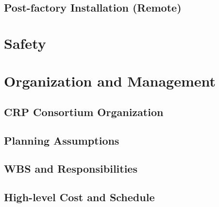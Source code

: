 \subsection{Post-factory Installation (Remote)}
\label{sec:fddp-crp-qc-remote}



\section{Safety}
\label{sec:fddp-crp-safety}






\section{Organization and Management}
\label{sec:fddp-crp-org}

\subsection{CRP Consortium Organization}
\label{sec:fddp-crp-org-consortium}


\subsection{Planning Assumptions}
\label{sec:fddp-crp-org-assmp}


\subsection{WBS and Responsibilities}
\label{sec:fddp-crp-org-wbs}

\subsection{High-level Cost and Schedule}
\label{sec:fddp-crp-org-cs}














